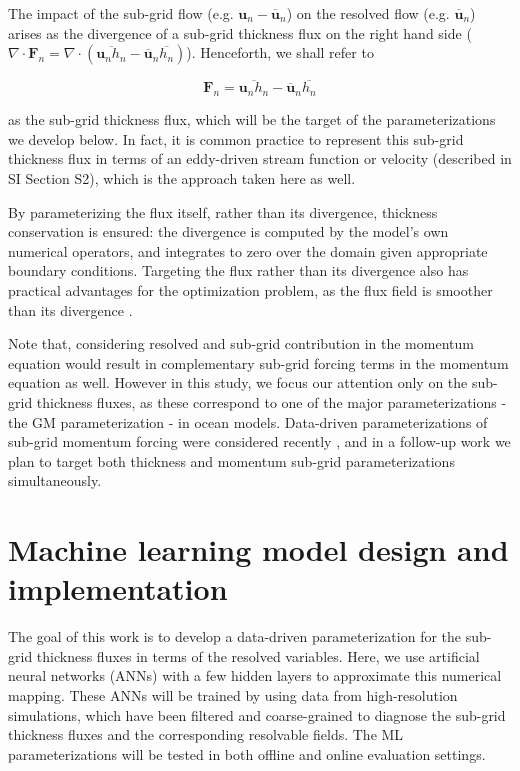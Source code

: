 \documentclass[draft]{agujournal2019}
\begin{document}
The impact of the sub-grid flow (e.g. ${\mathbf{u}}_n -\overline{\mathbf{u}}_n$) on the resolved flow (e.g. $\overline{\mathbf{u}}_n$) arises as the divergence of a sub-grid thickness flux on the right hand side ($\nabla \cdot \mathbf{F}_n = \nabla \cdot (\overline{\mathbf{u}_n h_n} - \overline{\mathbf{u}}_n \overline{h_n})$). Henceforth, we shall refer to 
\begin{linenomath*}
\begin{equation}
\mathbf{F}_n = \overline{\mathbf{u}_n h_n} - \overline{\mathbf{u}}_n \overline{h_n}     
\end{equation}
\end{linenomath*}
as the sub-grid thickness flux, which will be the target of the parameterizations we develop below. In fact, it is common practice to represent this sub-grid thickness flux in terms of an eddy-driven stream function or velocity (described in SI Section S2), which is the approach taken here as well. 

By parameterizing the flux itself, rather than its divergence, thickness conservation is ensured: the divergence is computed by the model's own numerical operators, and integrates to zero over the domain given appropriate boundary conditions. Targeting the flux rather than its divergence also has practical advantages for the optimization problem, as the flux field is smoother than its divergence \cite{yan2024choice}. 

Note that, considering resolved and sub-grid contribution in the momentum equation would result in complementary sub-grid forcing terms in the momentum equation as well. However in this study, we focus our attention only on the sub-grid thickness fluxes, as these correspond to one of the major parameterizations - the GM parameterization - in ocean models. 
Data-driven parameterizations of sub-grid momentum forcing were considered recently \cite{perezhogin2024stable, zhang2023implementation, zanna2020data}, and in a follow-up work we plan to target both thickness and momentum sub-grid parameterizations simultaneously. 




\section{Machine learning model design and implementation}
The goal of this work is to develop a data-driven parameterization for the sub-grid thickness fluxes in terms of the resolved variables. Here, we use artificial neural networks (ANNs) with a few hidden layers to approximate this numerical mapping. These ANNs will be trained by using data from high-resolution simulations, which have been filtered and coarse-grained to diagnose the sub-grid thickness fluxes and the corresponding resolvable fields. The ML parameterizations will be tested in both offline and online evaluation settings. 
\end{document}

